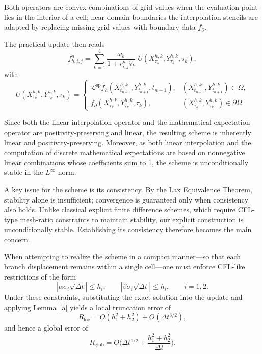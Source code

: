 \documentclass[11pt]{article}
\theoremstyle{mythm}
\theoremstyle{definition}
\begin{document}
	Both operators are convex combinations of grid values when the evaluation point lies in the interior of a cell; near domain boundaries the interpolation stencils are adapted by replacing missing grid values with boundary data $f_{\partial}$.
	
	The practical update then reads
	\begin{equation}\label{eq:practical}
		f_{h,i,j}^{n}
		= \sum_{k=1}^4 \frac{\omega_k}{1+r_{i,j}^n\hat\tau_k}\;U(X_{\tau_k}^{h,k},Y_{\tau_k}^{h,k},\tau_k),
	\end{equation}
	with
	\[
	U(X_{\tau_k}^{h,k},Y_{\tau_k}^{h,k},\tau_k)=
	\begin{cases}
		\mathcal{L}^{\mathrm{sp}}f_h(X_{t_{n+1}}^{h,k},Y_{t_{n+1}}^{h,k},t_{n+1}), & (X_{t_{n+1}}^{h,k},Y_{t_{n+1}}^{h,k})\in\Omega,\\[2mm]
		f_{\partial}(X_{\tau_k}^{h,k},Y_{\tau_k}^{h,k},\tau_k), & (X_{\tau_k}^{h,k},Y_{\tau_k}^{h,k})\in\partial\Omega.
	\end{cases}
	\]
	
	Since both the linear interpolation operator and the mathematical expectation operator are positivity-preserving and linear, the resulting scheme is inherently linear and positivity-preserving. Moreover, as both linear interpolation and the computation of discrete mathematical expectations are based on nonnegative linear combinations whose coefficients sum to 1, the scheme is unconditionally stable in the $L^\infty$ norm.
	
	A key issue for the scheme is its consistency. By the Lax Equivalence Theorem, stability alone is insufficient; convergence is guaranteed only when consistency also holds. Unlike classical explicit finite difference schemes, which require CFL-type mesh-ratio constraints to maintain stability, our explicit construction is unconditionally stable. Establishing its consistency therefore becomes the main concern.
	
	When attempting to realize the scheme in a compact manner—so that each branch displacement remains within a single cell—one must enforce CFL-like restrictions of the form
	\[
	|\alpha\sigma_i\sqrt{\Delta t}| \le h_i,\qquad
	|\beta\sigma_i\sqrt{\Delta t}| \le h_i,\qquad i=1,2.
	\]
	Under these constraints, substituting the exact solution into the update and applying Lemma~\ref{a} yields a local truncation error of
	\[
	R_{\mathrm{loc}} = O(h_1^2+h_2^2) + O(\Delta t^{3/2}),
	\]
	and hence a global error of
	\[
	R_{\mathrm{glob}}
	= O\Big(\Delta t^{1/2} + \frac{h_1^2+h_2^2}{\Delta t}\Big).
	\]
	
\end{document}
